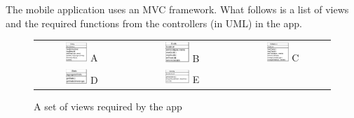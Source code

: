 \documentclass[a4paper, 11pt, titlepage]{article}
\begin{document}
The mobile application uses an MVC framework. What follows is a list of views and the required functions from the controllers (in UML) in the app.

\begin{figure}[H]
	\centering
	\begin{tabular}{ccc}
	\includegraphics[width=0.25\textwidth]{figures/object-models/AppDiary.pdf} A & \includegraphics[width=0.25\textwidth]{figures/object-models/AppGoals.pdf} B & \includegraphics[width=0.25\textwidth]{figures/object-models/AppSchedule.pdf} C \\
	\includegraphics[width=0.25\textwidth]{figures/object-models/AppStats.pdf} D & \includegraphics[width=0.25\textwidth]{figures/object-models/AppSurvey.pdf} E
	\end{tabular}
	\caption{A set of views required by the app}
\end{figure}

\newpage
\end{document}
